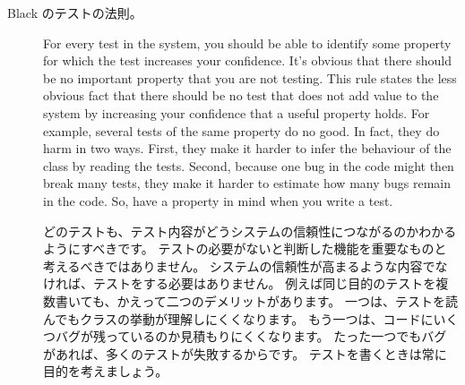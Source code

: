 \documentclass[a4paper,10pt,twoside]{book}
\begin{document}
{\begin{description}
\item[Black のテストの法則。]


  For every test in the system, you should be able to identify some property for which
  the test increases your confidence.
  It's obvious that there should be no important property that you are not testing.
  This rule states the less obvious fact that there should be
  no test that does not add value to the system by increasing your confidence that a useful property
  holds.
  For example, several tests of the same property do no good. 
  In fact, they do harm in two ways.
  First, they make it harder to infer the behaviour of the class by reading the tests. 
  Second, 
  because one bug in the code might then break many tests, they make it harder to estimate how many bugs remain in the code.
  So, have a property in mind when you write a test.
\fi

  どのテストも、テスト内容がどうシステムの信頼性につながるのかわかるようにすべきです。
  テストの必要がないと判断した機能を重要なものと考えるべきではありません。
  システムの信頼性が高まるような内容でなければ、テストをする必要はありません。
  例えば同じ目的のテストを複数書いても、かえって二つのデメリットがあります。
  一つは、テストを読んでもクラスの挙動が理解しにくくなります。
  もう一つは、コードにいくつバグが残っているのか見積もりにくくなります。
  たった一つでもバグがあれば、多くのテストが失敗するからです。
  テストを書くときは常に目的を考えましょう。


\end{description}



}
\end{document}
